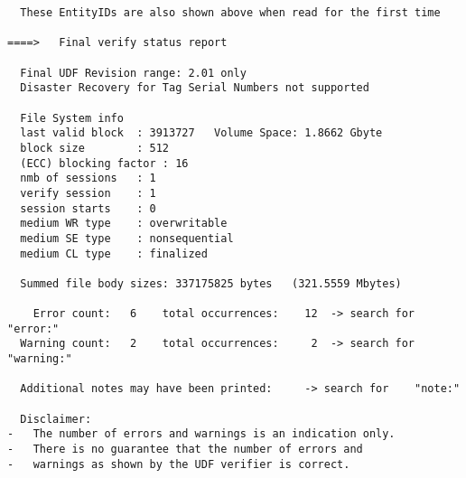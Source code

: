 \begin{lstlisting}
  These EntityIDs are also shown above when read for the first time

====>   Final verify status report

  Final UDF Revision range: 2.01 only
  Disaster Recovery for Tag Serial Numbers not supported

  File System info
  last valid block  : 3913727   Volume Space: 1.8662 Gbyte
  block size        : 512
  (ECC) blocking factor : 16
  nmb of sessions   : 1
  verify session    : 1
  session starts    : 0       
  medium WR type    : overwritable
  medium SE type    : nonsequential
  medium CL type    : finalized

  Summed file body sizes: 337175825 bytes   (321.5559 Mbytes)

    Error count:   6    total occurrences:    12  -> search for   "error:"
  Warning count:   2    total occurrences:     2  -> search for "warning:"

  Additional notes may have been printed:     -> search for    "note:"

  Disclaimer:
-   The number of errors and warnings is an indication only.
-   There is no guarantee that the number of errors and
-   warnings as shown by the UDF verifier is correct.
\end{lstlisting}
\pagebreak
